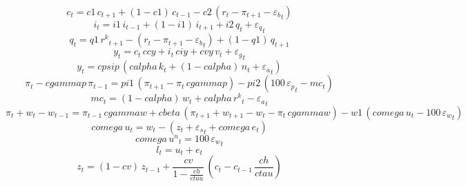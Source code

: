 \begin{dmath}
{{c}}_{t}={c1}\, {{c}}_{t+1}+\left(1-{c1}\right)\, {{c}}_{t-1}-{c2}\, \left({{r}}_{t}-{{\pi}}_{t+1}-{{\varepsilon_b}}_{t}\right)
\end{dmath}
\begin{dmath}
{{i}}_{t}={i1}\, {{i}}_{t-1}+\left(1-{i1}\right)\, {{i}}_{t+1}+{i2}\, {{q}}_{t}+{{\varepsilon_q}}_{t}
\end{dmath}
\begin{dmath}
{{q}}_{t}={q1}\, {{r^{k}}}_{t+1}-\left({{r}}_{t}-{{\pi}}_{t+1}-{{\varepsilon_b}}_{t}\right)+\left(1-{q1}\right)\, {{q}}_{t+1}
\end{dmath}
\begin{dmath}
{{y}}_{t}={{c}}_{t}\, {ccy}+{{i}}_{t}\, {ciy}+{cvy}\, {{v}}_{t}+{{\varepsilon_g}}_{t}
\end{dmath}
\begin{dmath}
{{y}}_{t}={cpsip}\, \left({calpha}\, {{k}}_{t}+\left(1-{calpha}\right)\, {{n}}_{t}+{{\varepsilon_a}}_{t}\right)
\end{dmath}
\begin{dmath}
{{\pi}}_{t}-{cgammap}\, {{\pi}}_{t-1}={pi1}\, \left({{\pi}}_{t+1}-{{\pi}}_{t}\, {cgammap}\right)-{pi2}\, \left(100\, {{\varepsilon_p}}_{t}-{{mc}}_{t}\right)
\end{dmath}
\begin{dmath}
{{mc}}_{t}=\left(1-{calpha}\right)\, {{w}}_{t}+{calpha}\, {{r^{k}}}_{t}-{{\varepsilon_a}}_{t}
\end{dmath}
\begin{dmath}
{{\pi}}_{t}+{{w}}_{t}-{{w}}_{t-1}={{\pi}}_{t-1}\, {cgammaw}+{cbeta}\, \left({{\pi}}_{t+1}+{{w}}_{t+1}-{{w}}_{t}-{{\pi}}_{t}\, {cgammaw}\right)-{w1}\, \left({comega}\, {{u}}_{t}-100\, {{\varepsilon_w}}_{t}\right)
\end{dmath}
\begin{dmath}
{comega}\, {{u}}_{t}={{w}}_{t}-\left({{z}}_{t}+{{\varepsilon_s}}_{t}+{comega}\, {{e}}_{t}\right)
\end{dmath}
\begin{dmath}
{comega}\, {{u^{n}}}_{t}=100\, {{\varepsilon_w}}_{t}
\end{dmath}
\begin{dmath}
{{l}}_{t}={{u}}_{t}+{{e}}_{t}
\end{dmath}
\begin{dmath}
{{z}}_{t}=\left(1-{cv}\right)\, {{z}}_{t-1}+\frac{{cv}}{1-\frac{{ch}}{{ctau}}}\, \left({{c}}_{t}-{{c}}_{t-1}\, \frac{{ch}}{{ctau}}\right)
\end{dmath}
